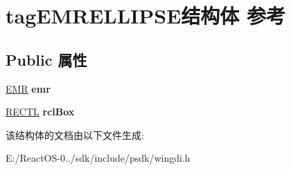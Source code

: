 \hypertarget{structtag_e_m_r_e_l_l_i_p_s_e}{}\section{tag\+E\+M\+R\+E\+L\+L\+I\+P\+S\+E结构体 参考}
\label{structtag_e_m_r_e_l_l_i_p_s_e}
\subsection*{Public 属性}
\begin{DoxyCompactItemize}
\item 
\mbox{\label{structtag_e_m_r_e_l_l_i_p_s_e_a3a28009976d37045671d73864743c54a}} 
\hyperlink{structtag_e_m_r}{E\+MR} {\bfseries emr}
\item 
\mbox{\label{structtag_e_m_r_e_l_l_i_p_s_e_a1348caad2b8dc373d0a226d7d1c7f16a}} 
\hyperlink{struct___r_e_c_t_l}{R\+E\+C\+TL} {\bfseries rcl\+Box}
\end{DoxyCompactItemize}


该结构体的文档由以下文件生成\+:\begin{DoxyCompactItemize}
\item 
E\+:/\+React\+O\+S-\/0../sdk/include/psdk/wingdi.\+h\end{DoxyCompactItemize}
